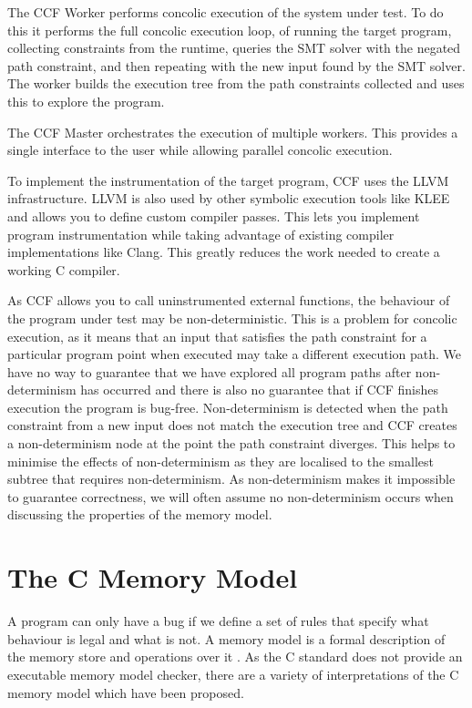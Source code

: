 \documentclass[12pt,twoside]{report}
\begin{document}
The CCF Worker performs concolic execution of the system under test. To do this it performs the full concolic execution loop, of running the target program, collecting constraints from the runtime, queries the SMT solver with the negated path constraint, and then repeating with the new input found by the SMT solver. The worker builds the execution tree from the path constraints collected and uses this to explore the program.

The CCF Master orchestrates the execution of multiple workers. This provides a single interface to the user while allowing parallel concolic execution.

To implement the instrumentation of the target program, CCF uses the LLVM infrastructure. LLVM is also used by other symbolic execution tools like KLEE \cite{cadar2008klee} and allows you to define custom compiler passes. This lets you implement program instrumentation while taking advantage of existing compiler implementations like Clang. This greatly reduces the work needed to create a working C compiler.

As CCF allows you to call uninstrumented external functions, the behaviour of the program under test may be non-deterministic. This is a problem for concolic execution, as it means that an input that satisfies the path constraint for a particular program point when executed may take a different execution path. We have no way to guarantee that we have explored all program paths after non-determinism has occurred and there is also no guarantee that if CCF finishes execution the program is bug-free. Non-determinism is detected when the path constraint from a new input does not match the execution tree and CCF creates a non-determinism node at the point the path constraint diverges. This helps to minimise the effects of non-determinism as they are localised to the smallest subtree that requires non-determinism. As non-determinism makes it impossible to guarantee correctness, we will often assume no non-determinism occurs when discussing the properties of the memory model.

\section{The C Memory Model}
A program can only have a bug if we define a set of rules that specify what behaviour is legal and what is not. A memory model is a formal description of the memory store and operations over it \cite{leroy2008formal}. As the C standard does not provide an executable memory model checker, there are a variety of interpretations of the C memory model which have been proposed.
\end{document}
